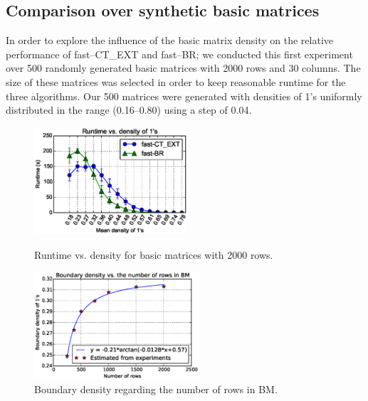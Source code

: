 \documentclass[citeauthoryear]{llncs}
\begin{document}
%
\subsection{Comparison over synthetic basic matrices}
%
In order to explore the influence of the basic matrix density on the relative performance of fast--CT\_EXT and fast--BR; we conducted this first experiment over 500 randomly generated basic matrices with 2000 rows and 30 columns. The size of these matrices was selected in order to keep reasonable runtime for the three algorithms. Our 500 matrices were generated with densities of 1's uniformly distributed in the range (0.16--0.80) using a step of 0.04. 

	\begin{figure}[htb]
	    \centering
	    \begin{minipage}[b]{0.48\textwidth}
	        \centering
	        \includegraphics[height=4cm]{2000rows.eps}	        
	        \caption{Runtime vs. density for basic matrices with 2000 rows.}
	        \label{fig:density}
	    \end{minipage}
	    \begin{minipage}[b]{0.48\textwidth}
	    	\centering
	    	\includegraphics[height=4cm]{fitting.eps}	        
	    	\caption{Boundary density regarding the number of rows in BM.}
	    	\label{fig:fitting}
	    \end{minipage}
	\end{figure}
\end{document}
